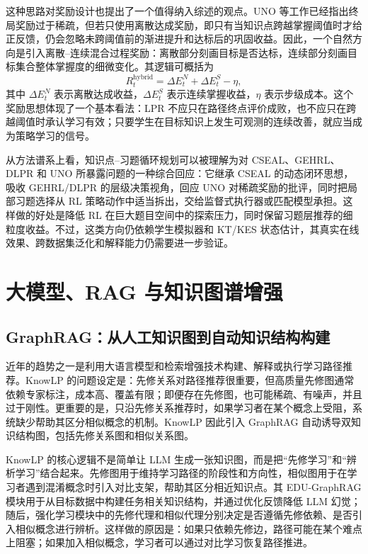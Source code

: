 \documentclass[UTF8,a4paper,zihao=-4]{ctexart}
\begin{document}
这种思路对奖励设计也提出了一个值得纳入综述的观点。UNO 等工作已经指出终局奖励过于稀疏，但若只使用离散达成奖励，即只有当知识点跨越掌握阈值时才给正反馈，仍会忽略未跨阈值前的渐进提升和达标后的巩固收益。因此，一个自然方向是引入离散--连续混合过程奖励：离散部分刻画目标是否达标，连续部分刻画目标集合整体掌握度的细微变化。其逻辑可概括为
\begin{equation}
R_t^{\mathrm{hybrid}}
=
\Delta E_t^{N}
+
\Delta E_t^{S}
-
\eta,
\end{equation}
其中 $\Delta E_t^{N}$ 表示离散达成收益，$\Delta E_t^{S}$ 表示连续掌握收益，$\eta$ 表示步级成本。这个奖励思想体现了一个基本看法：LPR 不应只在路径终点评价成败，也不应只在跨越阈值时承认学习有效；只要学生在目标知识上发生可观测的连续改善，就应当成为策略学习的信号。

从方法谱系上看，知识点--习题循环规划可以被理解为对 CSEAL、GEHRL、DLPR 和 UNO 所暴露问题的一种综合回应：它继承 CSEAL 的动态闭环思想，吸收 GEHRL/DLPR 的层级决策视角，回应 UNO 对稀疏奖励的批评，同时把局部习题选择从 RL 策略动作中适当拆出，交给监督式执行器或匹配模型承担。这样做的好处是降低 RL 在巨大题目空间中的探索压力，同时保留习题层推荐的细粒度收益。不过，这类方向仍依赖学生模拟器和 KT/KES 状态估计，其真实在线效果、跨数据集泛化和解释能力仍需要进一步验证。

\section{大模型、RAG 与知识图谱增强}

\subsection{GraphRAG：从人工知识图到自动知识结构构建}

近年的趋势之一是利用大语言模型和检索增强技术构建、解释或执行学习路径推荐。KnowLP 的问题设定是：先修关系对路径推荐很重要，但高质量先修图通常依赖专家标注，成本高、覆盖有限；即便存在先修图，也可能稀疏、有噪声，并且过于刚性。更重要的是，只沿先修关系推荐时，如果学习者在某个概念上受阻，系统缺少帮助其区分相似概念的机制。KnowLP 因此引入 GraphRAG 自动诱导双知识结构图，包括先修关系图和相似关系图\cite{Cheng2025KnowLP}。

KnowLP 的核心逻辑不是简单让 LLM 生成一张知识图，而是把“先修学习”和“辨析学习”结合起来。先修图用于维持学习路径的阶段性和方向性，相似图用于在学习者遇到混淆概念时引入对比支架，帮助其区分相近知识点。其 EDU-GraphRAG 模块用于从目标数据中构建任务相关知识结构，并通过优化反馈降低 LLM 幻觉；随后，强化学习模块中的先修代理和相似代理分别决定是否遵循先修依赖、是否引入相似概念进行辨析。这样做的原因是：如果只依赖先修边，路径可能在某个难点上阻塞；如果加入相似概念，学习者可以通过对比学习恢复路径推进。
\end{document}
